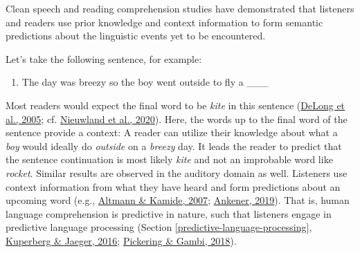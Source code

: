 \documentclass[a4paper, nobind]{templates/ociamthesis}
\providecommand{\tightlist}{%
  \setlength{\itemsep}{0pt}\setlength{\parskip}{0pt}}
\begin{document}
Clean speech and reading comprehension studies have demonstrated that listeners and readers use prior knowledge and context information to form semantic predictions about the linguistic events yet to be encountered.

Let's take the following sentence, for example:

\begin{enumerate}
\def\labelenumi{(\arabic{enumi})}
\tightlist
\item
  The day was breezy so the boy went outside to fly a \_\_\_\label{kite}
\end{enumerate}

Most readers would expect the final word to be \emph{kite} in this sentence (\protect\hyperlink{ref-Delong2005}{DeLong et al., 2005}; cf. \protect\hyperlink{ref-Nieuwland2020a}{Nieuwland et al., 2020}). Here, the words up to the final word of the sentence provide a context:
A reader can utilize their knowledge about what a \emph{boy} would ideally do \emph{outside} on a \emph{breezy} day.
It leads the reader to predict that the sentence continuation is most likely \emph{kite} and not an improbable word like \emph{rocket}.
Similar results are observed in the auditory domain as well.
Listeners use context information from what they have heard and form predictions about an upcoming word (e.g., \protect\hyperlink{ref-Altmann2007}{Altmann \& Kamide, 2007}; \protect\hyperlink{ref-Ankener2019}{Ankener, 2019}).
That is, human language comprehension is predictive in nature, such that listeners engage in predictive language processing (Section \ref{predictive-language-processing}, \protect\hyperlink{ref-Kuperberg2016}{Kuperberg \& Jaeger, 2016}; \protect\hyperlink{ref-Pickering2018}{Pickering \& Gambi, 2018}).
\end{document}
